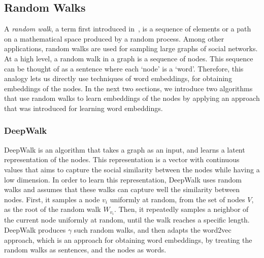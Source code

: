 \subsection{Random Walks}

A \emph{random walk}, a term first introduced in~\cite{pearson1905problem},
is a sequence of elements or a path on a mathematical space
produced by a random process. Among other applications, random walks are used
for sampling large graphs of social networks.
At a high level, a random walk in a graph is a sequence of nodes. This sequence
can be thought of as a sentence where each `node' is a `word'. Therefore, this
analogy lets us directly use techniques of word embeddings, for obtaining
embeddings of the nodes. In the next two sections, we introduce
two algorithms that use random walks to learn embeddings of the nodes
by applying an approach that was introduced for learning word embeddings.

\subsubsection{DeepWalk}

DeepWalk is an algorithm that takes a graph as an input, and learns a latent
representation of the nodes. This representation is a vector with continuous
values that aims to capture the social similarity between the nodes while having
a low dimension. In order to learn this representation, DeepWalk uses random
walks and assumes that these walks can capture well the similarity between
nodes. First, it samples a node $v_i$ uniformly at random, from the set of nodes
$V$, as the root of the random walk $W_{v_i}$. Then, it repeatedly samples
a neighbor of the current node uniformly at random, until the walk reaches a
specific length. DeepWalk produces $\gamma$ such random
walks, and then adapts the word2vec approach, which is an approach for obtaining
word embeddings, by treating the random walks as sentences, and the nodes as
words.

